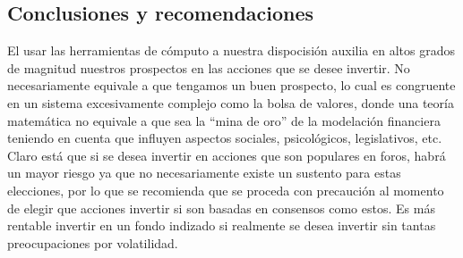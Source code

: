 \documentclass[letterpaper, 12pt]{article}
\begin{document}
\begin{justify}
        \section{Conclusiones y recomendaciones}
        \justify
        El usar las herramientas de cómputo a nuestra dispocisión auxilia en altos grados de magnitud nuestros prospectos
        en las acciones que se desee invertir. No necesariamente equivale a que tengamos un buen prospecto, lo cual es congruente
        en un sistema excesivamente complejo como la bolsa de valores, donde una teoría matemática no equivale a que sea la ``mina de oro'' 
        de la modelación financiera teniendo en cuenta que influyen aspectos sociales, psicológicos, legislativos, etc.
        \\\newline
        Claro está que si se desea invertir en acciones que son populares en foros, habrá un mayor riesgo ya que no necesariamente existe un
        sustento para estas elecciones, por lo que se recomienda que se proceda con precaución al momento de elegir que acciones invertir si son basadas
        en consensos como estos. Es más rentable invertir en un fondo indizado si realmente se desea invertir sin tantas preocupaciones por volatilidad.
    \end{justify}

    \newpage
    \renewcommand{\headrulewidth}{0pt}
    \renewcommand{\footrulewidth}{0pt}
    \fancyhead[L]{}
    \fancyhead[R]{}
    \fancyfoot[R]{\thepage}
    \printbibliography[heading=bibintoc]
\end{document}
